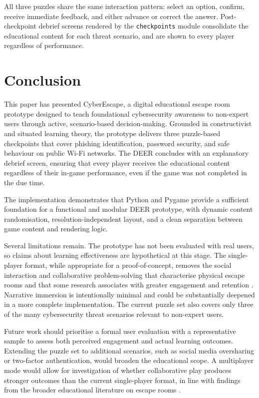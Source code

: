 \documentclass[sigconf, authorversion=true, nonacm=true]{acmart}%
\begin{document}
All three puzzles share the same interaction pattern: select an option, confirm, receive immediate feedback, and either advance or correct the answer. Post-checkpoint debrief screens rendered by the \texttt{checkpoints} module consolidate the educational content for each threat scenario, and are shown to every player regardless of performance.

\section{Conclusion}

This paper has presented CyberEscape, a digital educational escape room prototype designed to teach foundational cybersecurity awareness to non-expert users through active, scenario-based decision-making. Grounded in constructivist and situated learning theory, the prototype delivers three puzzle-based checkpoints that cover phishing identification, password security, and safe behaviour on public Wi-Fi networks. The DEER concludes with an explanatory debrief screen, ensuring that every player receives the educational content regardless of their in-game performance, even if the game was not completed in the due time.

The implementation demonstrates that Python and Pygame provide a sufficient foundation for a functional and modular DEER prototype, with dynamic content randomisation, resolution-independent layout, and a clean separation between game content and rendering logic.

Several limitations remain. The prototype has not been evaluated with real users, so claims about learning effectiveness are hypothetical at this stage. The single-player format, while appropriate for a proof-of-concept, removes the social interaction and collaborative problem-solving that characterise physical escape rooms and that some research associates with greater engagement and retention \cite{veldkamp_escape_2020, jarvelainen_relativity_2023}. Narrative immersion is intentionally minimal and could be substantially deepened in a more complete implementation. The current puzzle set also covers only three of the many cybersecurity threat scenarios relevant to non-expert users.

Future work should prioritise a formal user evaluation with a representative sample to assess both perceived engagement and actual learning outcomes. Extending the puzzle set to additional scenarios, such as social media oversharing or two-factor authentication, would broaden the educational scope. A multiplayer mode would allow for investigation of whether collaborative play produces stronger outcomes than the current single-player format, in line with findings from the broader educational literature on escape rooms \cite{makri_digital_2021, veldkamp_escape_2020}.
\end{document}
